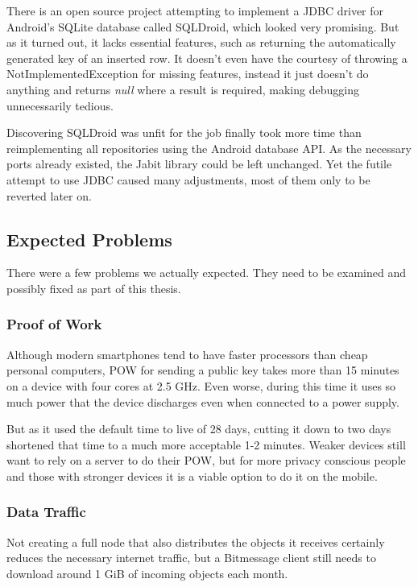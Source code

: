 \documentclass{bfh}
\begin{document}
  There is an open source project attempting to implement a \ac{JDBC} driver for Android’s SQLite database called SQLDroid, which looked very promising. But as it turned out, it lacks essential features, such as returning the automatically generated key of an inserted row. It doesn't even have the courtesy of throwing a NotImplementedException for missing features, instead it just doesn't do anything and returns \textit{null} where a result is required, making debugging unnecessarily tedious.\cite{github:sqldroid}

  Discovering SQLDroid was unfit for the job finally took more time than reimplementing all repositories using the Android database API. As the necessary ports already existed, the Jabit library could be left unchanged. Yet the futile attempt to use JDBC caused many adjustments, most of them only to be reverted later on.

  \subsection{Expected Problems}
  There were a few problems we actually expected. They need to be examined and possibly fixed as part of this thesis.

  \subsubsection{Proof of Work}
  Although modern smartphones tend to have faster processors than cheap personal computers, \acf{POW} for sending a public key takes more than 15 minutes on a device with four cores at 2.5 GHz. Even worse, during this time it uses so much power that the device discharges even when connected to a power supply.

  But as it used the default time to live of 28 days, cutting it down to two days shortened that time to a much more acceptable 1-2 minutes. Weaker devices still want to rely on a server to do their \ac{POW}, but for more privacy conscious people and those with stronger devices it is a viable option to do it on the mobile.

  \subsubsection{Data Traffic}
  Not creating a full node that also distributes the objects it receives certainly reduces the necessary internet traffic, but a Bitmessage client still needs to download around 1 GiB of incoming objects each month.
\end{document}

